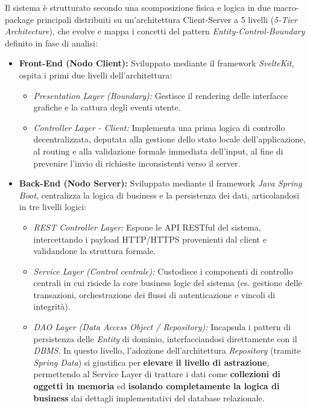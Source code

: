 Il sistema \`e strutturato secondo una scomposizione fisica e logica in due macro-package principali distribuiti su un'architettura Client-Server a 5 livelli (\textit{5-Tier Architecture}), che evolve e mappa i concetti del pattern \textit{Entity-Control-Boundary} definito in fase di analisi:

\begin{itemize}
    \item \textbf{Front-End (Nodo Client):} Sviluppato mediante il framework \textit{SvelteKit}, ospita i primi due livelli dell'architettura:
    \begin{itemize}
        \item \textit{Presentation Layer (Boundary):} Gestisce il rendering delle interfacce grafiche e la cattura degli eventi utente.
        \item \textit{Controller Layer - Client:} Implementa una prima logica di controllo decentralizzata, deputata alla gestione dello stato locale dell'applicazione, al routing e alla validazione formale immediata dell'input, al fine di prevenire l'invio di richieste inconsistenti verso il server.
    \end{itemize}
    
    \item \textbf{Back-End (Nodo Server):} Sviluppato mediante il framework \textit{Java Spring Boot}, centralizza la logica di business e la persistenza dei dati, articolandosi in tre livelli logici:
    \begin{itemize}
        \item \textit{REST Controller Layer:} Espone le API RESTful del sistema, intercettando i payload HTTP/HTTPS provenienti dal client e validandone la struttura formale.
        \item \textit{Service Layer (Control centrale):} Custodisce i componenti di controllo centrali in cui risiede la core business logic del sistema (es. gestione delle transazioni, orchestrazione dei flussi di autenticazione e vincoli di integrit\`a).
        \item \textit{DAO Layer (Data Access Object / Repository):} Incapsula i pattern di persistenza delle \textit{Entity} di dominio, interfacciandosi direttamente con il \textit{DBMS}. In questo livello, l'adozione dell'architettura \textit{Repository} (tramite \textit{Spring Data}) si giustifica per \textbf{elevare il livello di astrazione}, permettendo al Service Layer di trattare i dati come \textbf{collezioni di oggetti in memoria} ed \textbf{isolando completamente la logica di business} dai dettagli implementativi del database relazionale. 
   \end{itemize}
\end{itemize}


